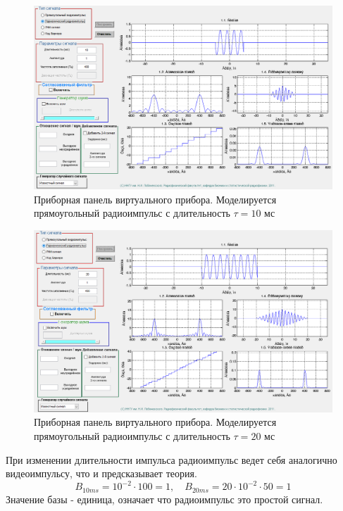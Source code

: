 \begin{figure}[H]
    \centering
    \includegraphics[width=0.9\linewidth]{imgs/t1s2_10.png}
    \caption{Приборная панель виртуального прибора. Моделируется
    прямоугольный радиоимпульс с длительность $\tau=10$ мс}
    \label{fig:task2_10}
\end{figure}
\begin{figure}[H]
    \centering
    \includegraphics[width=0.9\linewidth]{imgs/t1s2_20.png}
    \caption{Приборная панель виртуального прибора. Моделируется
    прямоугольный радиоимпульс с длительность $\tau=20$ мс}
    \label{fig:task2_20}
\end{figure}

При изменении длительности импульса радиоимпульс ведет себя аналогично
видеоимпульсу, что и предсказывает теория.
\begin{equation}
    B_{10ms} = 10^{-2} \cdot 100 = 1, \quad B_{20ms} = 20 \cdot 10^{-2} \cdot 50 = 1
    \label{eq:}
\end{equation}
Значение базы - единица, означает что радиоимпульс это простой сигнал.

